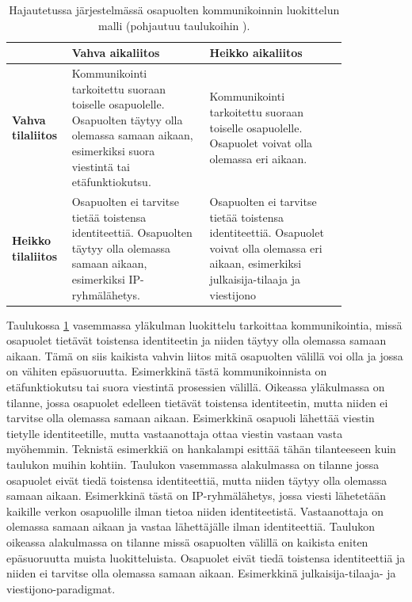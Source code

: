 \begin{table}[ht!]
	\caption{Hajautetussa järjestelmässä osapuolten kommunikoinnin luokittelun malli (pohjautuu taulukoihin \mbox{\cite[s.~231]{distributed-systems-concepts-and-design}} \mbox{\cite[s.~84]{cabri2000mobile}}).}
	\label{tab:communication-models}
	\begin{tabular}{p{0.1\linewidth} | p{0.37\linewidth} | p{0.37\linewidth}}
		\hline
		& \textbf{Vahva aikaliitos} & \textbf{Heikko aikaliitos} \\
		\hline
		\textbf{Vahva tilaliitos} & Kommunikointi tarkoitettu suoraan toiselle osapuolelle. Osapuolten täytyy olla olemassa samaan aikaan, esimerkiksi suora viestintä tai etäfunktiokutsu. & Kommunikointi tarkoitettu suoraan toiselle osapuolelle. Osapuolet voivat olla olemassa eri aikaan.\\
		\hline
		\textbf{Heikko tilaliitos} & Osapuolten ei tarvitse tietää toistensa identiteettiä. Osapuolten täytyy olla olemassa samaan aikaan, esimerkiksi IP-ryhmälähetys. & Osapuolten ei tarvitse tietää toistensa identiteettiä. Osapuolet voivat olla olemassa eri aikaan, esimerkiksi julkaisija-tilaaja ja viestijono \\
		\hline
	\end{tabular}
\end{table}

Taulukossa \ref{tab:communication-models} vasemmassa yläkulman luokittelu tarkoittaa kommunikointia, missä osapuolet tietävät toistensa identiteetin ja niiden täytyy olla olemassa samaan aikaan. Tämä on siis kaikista vahvin liitos mitä osapuolten välillä voi olla ja jossa on vähiten epäsuoruutta. Esimerkkinä tästä kommunikoinnista on etäfunktiokutsu tai suora viestintä prosessien välillä. Oikeassa yläkulmassa on tilanne, jossa osapuolet edelleen tietävät toistensa identiteetin, mutta niiden ei tarvitse olla olemassa samaan aikaan. Esimerkkinä osapuoli lähettää viestin tietylle identiteetille, mutta vastaanottaja ottaa viestin vastaan vasta myöhemmin. Teknistä esimerkkiä on hankalampi esittää tähän tilanteeseen kuin taulukon muihin kohtiin. Taulukon vasemmassa alakulmassa on tilanne jossa osapuolet eivät tiedä toistensa identiteettiä, mutta niiden täytyy olla olemassa samaan aikaan. Esimerkkinä tästä on IP-ryhmälähetys, jossa viesti lähetetään kaikille verkon osapuolille ilman tietoa niiden identiteetistä. Vastaanottaja on olemassa samaan aikaan ja vastaa lähettäjälle ilman identiteettiä. Taulukon oikeassa alakulmassa on tilanne missä osapuolten välillä on kaikista eniten epäsuoruutta muista luokitteluista. Osapuolet eivät tiedä toistensa identiteettiä ja niiden ei tarvitse olla olemassa samaan aikaan. Esimerkkinä julkaisija-tilaaja- ja viestijono-paradigmat. \mbox{\cite[s.~230--232]{distributed-systems-concepts-and-design}} \mbox{\cite{cabri2000mobile}}

